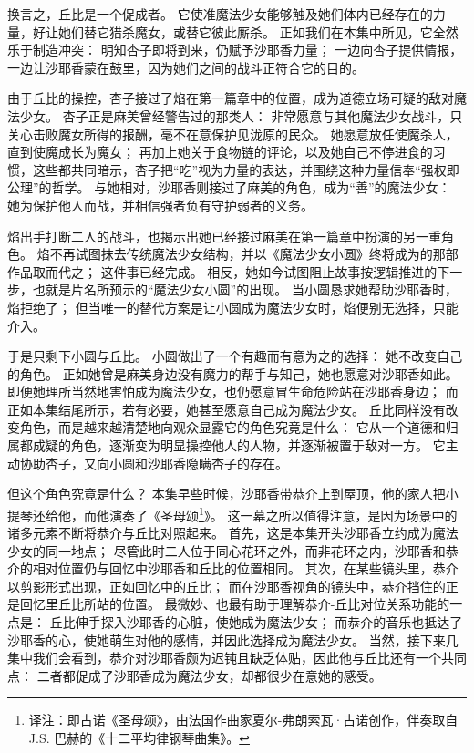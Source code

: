 换言之，丘比是一个促成者。
它使准魔法少女能够触及她们体内已经存在的力量，好让她们替它猎杀魔女，或替它彼此厮杀。
正如我们在本集中所见，它全然乐于制造冲突：
明知杏子即将到来，仍赋予沙耶香力量；
一边向杏子提供情报，一边让沙耶香蒙在鼓里，因为她们之间的战斗正符合它的目的。

由于丘比的操控，杏子接过了焰在第一篇章中的位置，成为道德立场可疑的敌对魔法少女。
杏子正是麻美曾经警告过的那类人：
非常愿意与其他魔法少女战斗，只关心击败魔女所得的报酬，毫不在意保护见泷原的民众。
她愿意放任使魔杀人，直到使魔成长为魔女；
再加上她关于食物链的评论，以及她自己不停进食的习惯，这些都共同暗示，杏子把“吃”视为力量的表达，并围绕这种力量信奉“强权即公理”的哲学。
与她相对，沙耶香则接过了麻美的角色，成为“善”的魔法少女：
她为保护他人而战，并相信强者负有守护弱者的义务。

焰出手打断二人的战斗，也揭示出她已经接过麻美在第一篇章中扮演的另一重角色。
焰不再试图抹去传统魔法少女结构，并以《魔法少女小圆》终将成为的那部作品取而代之；
这件事已经完成。
相反，她如今试图阻止故事按逻辑推进的下一步，也就是片名所预示的“魔法少女小圆”的出现。
当小圆恳求她帮助沙耶香时，焰拒绝了；
但当唯一的替代方案是让小圆成为魔法少女时，焰便别无选择，只能介入。

于是只剩下小圆与丘比。
小圆做出了一个有趣而有意为之的选择：
她不改变自己的角色。
正如她曾是麻美身边没有魔力的帮手与知己，她也愿意对沙耶香如此。
即便她理所当然地害怕成为魔法少女，也仍愿意冒生命危险站在沙耶香身边；
而正如本集结尾所示，若有必要，她甚至愿意自己成为魔法少女。
丘比同样没有改变角色，而是越来越清楚地向观众显露它的角色究竟是什么：
它从一个道德和归属都成疑的角色，逐渐变为明显操控他人的人物，并逐渐被置于敌对一方。
它主动协助杏子，又向小圆和沙耶香隐瞒杏子的存在。

但这个角色究竟是什么？
本集早些时候，沙耶香带恭介上到屋顶，他的家人把小提琴还给他，而他演奏了《圣母颂\footnote{%
    译注：即古诺《圣母颂》，由法国作曲家夏尔-弗朗索瓦·古诺创作，伴奏取自 J.S. 巴赫的《十二平均律钢琴曲集》。
}》。
这一幕之所以值得注意，是因为场景中的诸多元素不断将恭介与丘比对照起来。
首先，这是本集开头沙耶香立约成为魔法少女的同一地点；
尽管此时二人位于同心花环之外，而非花环之内，沙耶香和恭介的相对位置仍与回忆中沙耶香和丘比的位置相同。
其次，在某些镜头里，恭介以剪影形式出现，正如回忆中的丘比；
而在沙耶香视角的镜头中，恭介挡住的正是回忆里丘比所站的位置。
最微妙、也最有助于理解恭介-丘比对位关系功能的一点是：
丘比伸手探入沙耶香的心脏，使她成为魔法少女；
而恭介的音乐也抵达了沙耶香的心，使她萌生对他的感情，并因此选择成为魔法少女。
当然，接下来几集中我们会看到，恭介对沙耶香颇为迟钝且缺乏体贴，因此他与丘比还有一个共同点：
二者都促成了沙耶香成为魔法少女，却都很少在意她的感受。

